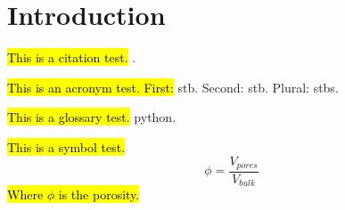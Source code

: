 
\section{Introduction} %
\label{sec:introduction}
\hl{This is a citation test.} \cite{Peaceman1978Interpretation}. \cite{Peaceman2003New}

\hl{This is an acronym test. First:} \gls{stb}. Second: \gls{stb}. Plural: \glspl{stb}.

\hl{This is a glossary test.} \gls{python}.

\hl{This is a symbol test.}
\begin{equation}
    \phi = \frac{V_{pores}}{V_{bulk}}
\end{equation}
\hl{Where  $\phi$ is the porosity.}
